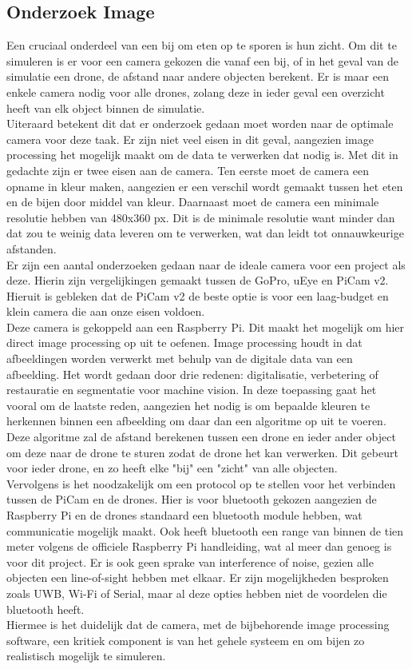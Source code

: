 \subsection{Onderzoek Image}
Een cruciaal onderdeel van een bij om eten op te sporen is hun zicht. Om dit te simuleren is er voor een camera gekozen die vanaf een bij, of in het geval van de simulatie een drone, de afstand naar andere objecten berekent. Er is maar een enkele camera nodig voor alle drones, zolang deze in ieder geval een overzicht heeft van elk object binnen de simulatie.\\
Uiteraard betekent dit dat er onderzoek gedaan moet worden naar de optimale camera voor deze taak. Er zijn niet veel eisen in dit geval, aangezien image processing het mogelijk maakt om de data te verwerken dat nodig is. Met dit in gedachte zijn er twee eisen aan de camera. Ten eerste moet de camera een opname in kleur maken, aangezien er een verschil wordt gemaakt tussen het eten en de bijen door middel van kleur. Daarnaast moet de camera een minimale resolutie hebben van 480x360 px. Dit is de minimale resolutie want minder dan dat zou te weinig data leveren om te verwerken, wat dan leidt tot onnauwkeurige afstanden.\\
Er zijn een aantal onderzoeken gedaan naar de ideale camera voor een project als deze. Hierin zijn vergelijkingen gemaakt tussen de GoPro, uEye en PiCam v2. Hieruit is gebleken dat de PiCam v2 de beste optie is voor een laag-budget en klein camera die aan onze eisen voldoen.\cite{picamstudies}\\
Deze camera is gekoppeld aan een Raspberry Pi. Dit maakt het mogelijk om hier direct image processing op uit te oefenen. Image processing houdt in dat afbeeldingen worden verwerkt met behulp van de digitale data van een afbeelding. Het wordt gedaan door drie redenen: digitalisatie, verbetering of restauratie en segmentatie voor machine vision.\cite{imageprocessing} In deze toepassing gaat het vooral om de laatste reden, aangezien het nodig is om bepaalde kleuren te herkennen binnen een afbeelding om daar dan een algoritme op uit te voeren. Deze algoritme zal de afstand berekenen tussen een drone en ieder ander object om deze naar de drone te sturen zodat de drone het kan verwerken. Dit gebeurt voor ieder drone, en zo heeft elke "bij" een "zicht" van alle objecten.\\
Vervolgens is het noodzakelijk om een protocol op te stellen voor het verbinden tussen de PiCam en de drones. Hier is voor bluetooth gekozen aangezien de Raspberry Pi en de drones standaard een bluetooth module hebben, wat communicatie mogelijk maakt. Ook heeft bluetooth een range van binnen de tien meter volgens de officiele Raspberry Pi handleiding, wat al meer dan genoeg is voor dit project. Er is ook geen sprake van interference of noise, gezien alle objecten een line-of-sight hebben met elkaar. Er zijn mogelijkheden besproken zoals UWB, Wi-Fi of Serial, maar al deze opties hebben niet de voordelen die bluetooth heeft.\\
Hiermee is het duidelijk dat de camera, met de bijbehorende image processing software, een kritiek component is van het gehele systeem en om bijen zo realistisch mogelijk te simuleren.\\
\newpage
